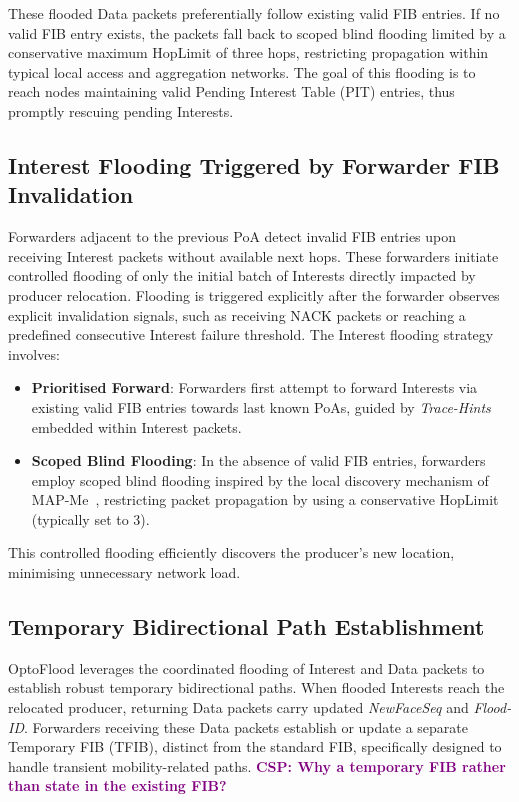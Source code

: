 \documentclass[10pt,conference]{IEEEtran}
\newcommand{\csp}[1]{\textbf{\textcolor{purple}{CSP: #1}}}
\begin{document}
These flooded Data packets preferentially follow existing valid FIB entries. If no valid FIB entry exists, the packets fall back to scoped blind flooding limited by a conservative maximum HopLimit of three hops, restricting propagation within typical local access and aggregation networks. The goal of this flooding is to reach nodes maintaining valid Pending Interest Table (PIT) entries, thus promptly rescuing pending Interests.

\subsection{Interest Flooding Triggered by Forwarder FIB Invalidation}
\label{sec:solution:interest-flooding}

Forwarders adjacent to the previous PoA detect invalid FIB entries upon receiving Interest packets without available next hops. These forwarders initiate controlled flooding of only the initial batch of Interests directly impacted by producer relocation. Flooding is triggered explicitly after the forwarder observes explicit invalidation signals, such as receiving NACK packets or reaching a predefined consecutive Interest failure threshold.
The Interest flooding strategy involves:
\begin{itemize}
\item \textbf{Prioritised Forward}: Forwarders first attempt to forward Interests via existing valid FIB entries towards last known PoAs, guided by \textit{Trace-Hints} embedded within Interest packets.
\item \textbf{Scoped Blind Flooding}: In the absence of valid FIB entries, forwarders employ scoped blind flooding inspired by the local discovery mechanism of MAP-Me~\cite{auge:2016:map-me}, restricting packet propagation by using a conservative HopLimit (typically set to 3).
\end{itemize}

This controlled flooding efficiently discovers the producer's new location, minimising unnecessary network load.

\subsection{Temporary Bidirectional Path Establishment}
\label{sec:solution:bidir}

OptoFlood leverages the coordinated flooding of Interest and Data packets to establish robust temporary bidirectional paths. When flooded Interests reach the relocated producer, returning Data packets carry updated \textit{NewFaceSeq} and \textit{Flood-ID}. Forwarders receiving these Data packets establish or update a separate Temporary FIB (TFIB), distinct from the standard FIB, specifically designed to handle transient mobility-related paths.
\csp{Why a temporary FIB rather than state in the existing FIB?}
\end{document}
